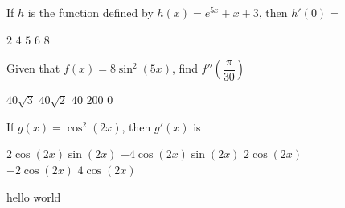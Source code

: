 \begin{questions}
    \question If $h$ is the function defined by $h(x) = e^{5x} + x + 3$, then $h'(0) = $ \\
    
    \begin{oneparchoices}
        \choice $2$
        \choice $4$
        \choice $5$
        \choice $6$
        \choice $8$
    \end{oneparchoices} \par \horizontalline

    \question Given that $f(x) = 8\sin^2 (5x)$, find $f''\left(\dfrac{\pi}{30}\right)$ \\

    \begin{oneparchoices}
        \choice $40\sqrt{3}$
        \choice $40\sqrt{2}$
        \choice $40$
        \choice $200$
        \choice $0$
    \end{oneparchoices} \par \horizontalline

    \question If $g(x) = \cos^2 (2x)$, then $g'(x)$ is \\

    \begin{oneparchoices}
        \choice $2\cos (2x)\sin (2x)$
        \choice $-4\cos (2x)\sin (2x)$
        \choice $2\cos (2x)$ \\[11pt]
        \makebox[0.25 \textwidth] \choice $-2\cos (2x)$ 
        \makebox[0.25 \textwidth] \choice $4\cos (2x)$
    \end{oneparchoices} \par \horizontalline

    \question hello world
    
\end{questions}